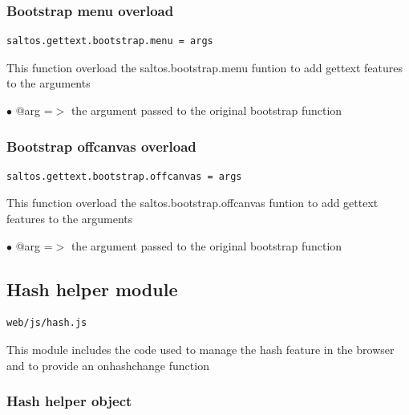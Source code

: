 \documentclass[a4paper]{article}
\begin{document}
\hypertarget{toc248}{}
\subsubsection{Bootstrap menu overload}

\begin{lstlisting}
saltos.gettext.bootstrap.menu = args
\end{lstlisting}

This function overload the saltos.bootstrap.menu funtion to add gettext
features to the arguments

\begin{compactitem}
\item[\color{myblue}$\bullet$] @arg =$>$ the argument passed to the original bootstrap function
\end{compactitem}

\hypertarget{toc249}{}
\subsubsection{Bootstrap offcanvas overload}

\begin{lstlisting}
saltos.gettext.bootstrap.offcanvas = args
\end{lstlisting}

This function overload the saltos.bootstrap.offcanvas funtion to add gettext
features to the arguments

\begin{compactitem}
\item[\color{myblue}$\bullet$] @arg =$>$ the argument passed to the original bootstrap function
\end{compactitem}

\hypertarget{toc250}{}
\subsection{Hash helper module}

\begin{lstlisting}
web/js/hash.js
\end{lstlisting}

This module includes the code used to manage the hash feature in the browser
and to provide an onhashchange function

\hypertarget{toc251}{}
\subsubsection{Hash helper object}
\end{document}
